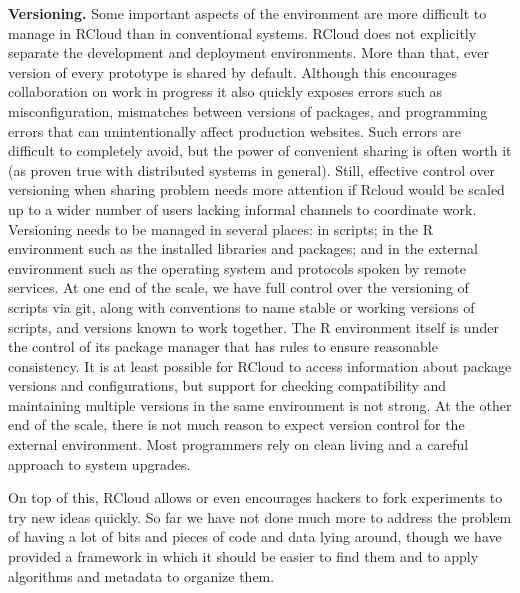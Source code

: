 {\bf Versioning.}
Some important aspects of the environment are more difficult to manage
in RCloud than in conventional systems. RCloud does not explicitly
separate the development and deployment environments. More than that,
ever version of every prototype is shared by default. Although this encourages
collaboration on work in progress it also quickly exposes errors such as
misconfiguration, mismatches between versions of packages, and programming
errors that can unintentionally affect production websites. Such errors
are difficult to completely avoid, but the power of convenient sharing is often
worth it (as proven true with distributed systems in general).
Still, effective control over versioning when sharing problem needs more
attention if Rcloud would be scaled up to a wider number of users lacking
informal channels to coordinate work.
Versioning needs to be managed in several places: in scripts;
in the R environment such as the installed libraries and packages;
and in the external environment such as the operating system and
protocols spoken by remote services. At one end of the scale, we have
full control over the versioning of scripts via git, along with conventions
to name stable or working versions of scripts, and versions known to work together.
The R environment itself is under the control of its package manager
that has rules to ensure reasonable consistency.
It is at least possible for RCloud to access information about
package versions and configurations, but support for checking compatibility
and maintaining multiple versions in the same environment is not strong.
At the other end of the scale, there is not much reason to expect version
control for the external environment. Most programmers rely on clean living
and a careful approach to system upgrades.

On top of this, RCloud allows or even encourages hackers to fork experiments
to try new ideas quickly. So far we have not done much more to address the
problem of having a lot of bits and pieces of code and data lying around,
though we have provided a framework in which it should be easier to find them
and to apply algorithms and metadata to organize them.


